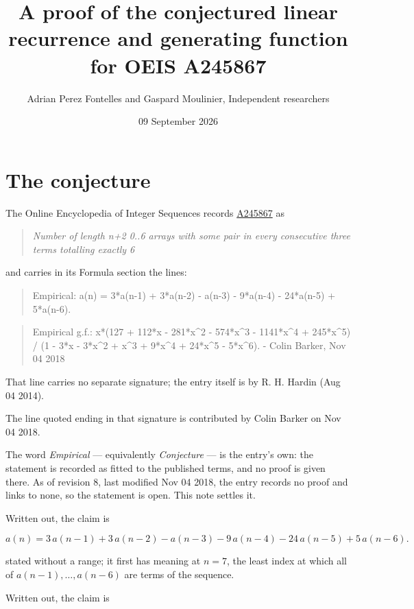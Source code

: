 \documentclass[11pt]{article}
\title{A proof of the conjectured linear recurrence and generating function for OEIS A245867}
\author{Adrian Perez Fontelles and Gaspard Moulinier, Independent researchers}
\date{09 September 2026}
\theoremstyle{definition}
\begin{document}
\maketitle
\section{The conjecture}

The Online Encyclopedia of Integer Sequences records \href{https://oeis.org/A245867}{A245867} as

\begin{quote}\itshape Number of length n+2 0..6 arrays with some pair in every consecutive three terms totalling exactly 6\end{quote}

and carries in its Formula section the lines:

\begin{quote}\ttfamily Empirical: a(n) = 3*a(n-1) + 3*a(n-2) - a(n-3) - 9*a(n-4) - 24*a(n-5) + 5*a(n-6).\end{quote}

\begin{quote}\ttfamily Empirical g.f.: x*(127 + 112*x - 281*x\textasciicircum{}2 - 574*x\textasciicircum{}3 - 1141*x\textasciicircum{}4 + 245*x\textasciicircum{}5) / (1 - 3*x - 3*x\textasciicircum{}2 + x\textasciicircum{}3 + 9*x\textasciicircum{}4 + 24*x\textasciicircum{}5 - 5*x\textasciicircum{}6). - Colin Barker, Nov 04 2018\end{quote}

That line carries no separate signature; the entry itself is by R. H. Hardin (Aug 04 2014).

The line quoted ending in that signature is contributed by Colin Barker on Nov 04 2018.

The word {\itshape Empirical} --- equivalently {\itshape Conjecture} --- is the entry's own: the statement is recorded as fitted to the published terms, and no proof is given there. As of revision 8, last modified Nov 04 2018, the entry records no proof and links to none, so the statement is open. This note settles it.

Written out, the claim is

\[a(n) = 3\,a(n-1) + 3\,a(n-2) - a(n-3) - 9\,a(n-4) - 24\,a(n-5) + 5\,a(n-6).\]

stated without a range; it first has meaning at $n = 7$, the least index at which all of $a(n-1),\dots,a(n-6)$ are terms of the sequence.

Written out, the claim is
\end{document}
